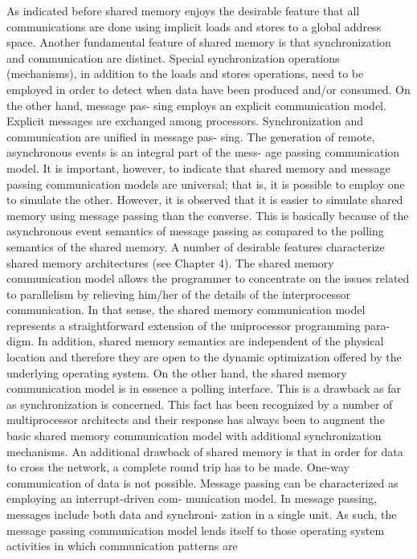 \documentclass[11pt]{article}
\begin{document}
As indicated before shared memory enjoys the desirable feature that all
communications are done using implicit loads and stores to a global address
space. Another fundamental feature of shared memory is that synchronization and
communication are distinct. Special synchronization operations (mechanisms), in
addition to the loads and stores operations, need to be employed in order to detect
when data have been produced and/or consumed. On the other hand, message pas-
sing employs an explicit communication model. Explicit messages are exchanged
among processors. Synchronization and communication are unified in message pas-
sing. The generation of remote, asynchronous events is an integral part of the mess-
age passing communication model. It is important, however, to indicate that shared
memory and message passing communication models are universal; that is, it is
possible to employ one to simulate the other. However, it is observed that it is
easier to simulate shared memory using message passing than the converse. This
is basically because of the asynchronous event semantics of message passing as
compared to the polling semantics of the shared memory.
A number of desirable features characterize shared memory architectures (see
Chapter 4). The shared memory communication model allows the programmer to concentrate on the issues related to parallelism by relieving him/her of the details of the
interprocessor communication. In that sense, the shared memory communication
model represents a straightforward extension of the uniprocessor programming para-
digm. In addition, shared memory semantics are independent of the physical location
and therefore they are open to the dynamic optimization offered by the underlying
operating system. On the other hand, the shared memory communication model is in
essence a polling interface. This is a drawback as far as synchronization is concerned.
This fact has been recognized by a number of multiprocessor architects and their
response has always been to augment the basic shared memory communication
model with additional synchronization mechanisms. An additional drawback of
shared memory is that in order for data to cross the network, a complete round trip
has to be made. One-way communication of data is not possible. Message passing can be characterized as employing an interrupt-driven com-
munication model. In message passing, messages include both data and synchroni-
zation in a single unit. As such, the message passing communication model lends
itself to those operating system activities in which communication patterns are
\end{document}
